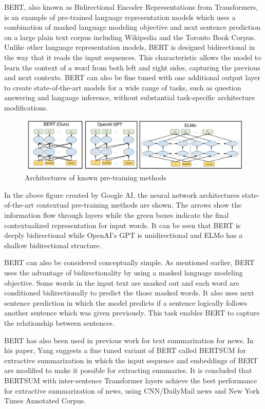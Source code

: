 \documentclass{article}
\begin{document}
BERT, also known as Bidirectional Encoder Representations from Transformers, is an example of pre-trained language representation models which uses a combination of masked language modeling objective and next sentence prediction on a large plain text corpus including Wikipedia and the Toronto Book Corpus. Unlike other language representation models, BERT is designed bidirectional in the way that it reads the input sequences. This characteristic allows the model to learn the context of a word from both left and right sides, capturing the previous and next contexts. BERT can also be fine tuned with one additional output layer to create state-of-the-art models for a wide range of tasks, such as question answering and language inference, without substantial task-specific architecture modifications. \cite{devlin2019bert}

\begin{figure}[h]
	\centering
	\includegraphics[scale=0.2]{image3.png}
	\caption{Architectures of known pre-training methods}
	\label{fig:mesh1}
\end{figure}

In the above figure created by Google AI, the neural network architectures state-of-the-art contextual pre-training methods are shown. The arrows show the information flow through layers while the green boxes indicate the final contextualized representation for input words. It can be seen that BERT is deeply bidirectional while OpenAI's GPT is unidirectional and ELMo has a shallow bidirectional structure.

BERT can also be considered conceptually simple. As mentioned earlier, BERT uses the advantage of bidirectionality by using a masked language modeling objective. Some words in the input text are masked out and each word are conditioned bidirectionally to predict the those masked words. It also uses next sentence prediction in which the model predicts if a sentence logically follows another sentence which was given previously. This task enables BERT to capture the relationship between sentences. \cite{devlin2019bert}

BERT has also been used in previous work for text summarization for news. In his paper, Yang suggests a fine tuned variant of BERT called BERTSUM for extractive summarization in which the input sequence and embeddings of BERT are modified to make it possible for extracting summaries. It is concluded that BERTSUM with inter-sentence Transformer layers achieve the best performance for extractive summarization of news, using CNN/DailyMail news and New York Times Annotated Corpus. \cite{liu2019finetune}
\end{document}

